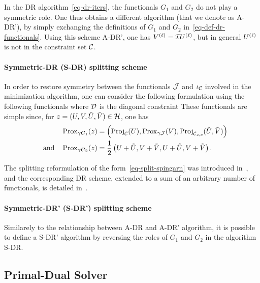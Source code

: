 In the DR algorithm~\eqref{eq-dr-iters}, the functionals $G_1$ and $G_2$ do not play a symmetric role. One thus obtains a different algorithm (that we denote as A-DR'), by simply exchanging the definitions of $G_1$ and $G_2$ in~\eqref{eq-def-dr-functionals}. Using this scheme A-DR', one has ${V}^{(\ell)} = \mathcal{I}{{U}^{(\ell)}}$, but in general ${U}^{(\ell)}$ is not in the constraint set $\mathcal{C}$.


\paragraph{Symmetric-DR (S-DR) splitting scheme}

In order to restore symmetry between the functionals $\mathcal{J}$ and $\iota_{\mathcal{C}}$ involved in the minimization algorithm, one can consider the following formulation
using the following functionals
where $\mathcal{D}$ is the diagonal constraint
These functionals are simple since, for $z = (U,V,\tilde U, \tilde V) \in \mathcal{H}$, one has
\begin{align*}
	\operatorname{Prox}_{\gamma G_1}(z) &= 
	\left( 
		\operatorname{Proj}_{\mathcal{C}}(U), \operatorname{Prox}_{\gamma \mathcal{J}}(V),
		\operatorname{Proj}_{\mathcal{C}_{s,c}}(\tilde U,\tilde V)
	 \right)\\
	\quad \text{and} \quad
	\operatorname{Prox}_{\gamma G_2}(z) &= \frac{1}{2} \left(  
		U+\tilde U, V+\tilde V, U+\tilde U, V+\tilde V
	 \right).
\end{align*}

The splitting reformulation of the form~\eqref{eq-split-spingarn} was introduced in~\cite{Spingarn85}, and the corresponding DR scheme, extended to a sum of an arbitrary number of functionals, is detailed in~\cite{Pustelnik-PPXA,CombettesPesquet-PPXA}. 


\paragraph{Symmetric-DR' (S-DR') splitting scheme}

Similarely to the relationship between A-DR and A-DR' algorithm, it is possible to define a S-DR' algorithm by reversing the roles of $G_1$ and $G_2$ in the algorithm S-DR.


\subsection{Primal-Dual Solver}
\label{PD-algo}

